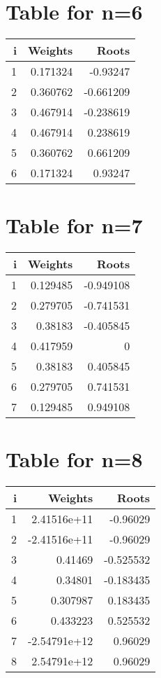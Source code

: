 \documentclass{article}
\begin{document}
\section*{Table for n=6}
\begin{tabular}{rrr}
\hline
   i &   Weights &     Roots \\
\hline
   1 &  0.171324 & -0.93247  \\
   2 &  0.360762 & -0.661209 \\
   3 &  0.467914 & -0.238619 \\
   4 &  0.467914 &  0.238619 \\
   5 &  0.360762 &  0.661209 \\
   6 &  0.171324 &  0.93247  \\
\hline
\end{tabular}

\section*{Table for n=7}
\begin{tabular}{rrr}
\hline
   i &   Weights &     Roots \\
\hline
   1 &  0.129485 & -0.949108 \\
   2 &  0.279705 & -0.741531 \\
   3 &  0.38183  & -0.405845 \\
   4 &  0.417959 &  0        \\
   5 &  0.38183  &  0.405845 \\
   6 &  0.279705 &  0.741531 \\
   7 &  0.129485 &  0.949108 \\
\hline
\end{tabular}

\section*{Table for n=8}
\begin{tabular}{rrr}
\hline
   i &      Weights &     Roots \\
\hline
   1 &  2.41516e+11 & -0.96029  \\
   2 & -2.41516e+11 & -0.96029  \\
   3 &  0.41469     & -0.525532 \\
   4 &  0.34801     & -0.183435 \\
   5 &  0.307987    &  0.183435 \\
   6 &  0.433223    &  0.525532 \\
   7 & -2.54791e+12 &  0.96029  \\
   8 &  2.54791e+12 &  0.96029  \\
\hline
\end{tabular}
\end{document}
